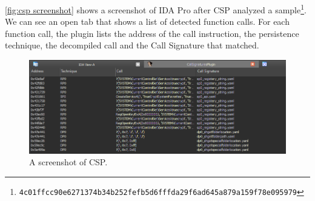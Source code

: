 \medskip

\autoref{fig:csp screenshot} shows a screenshot of IDA Pro after CSP analyzed a sample\footnote{\texttt{4c01ffcc90e6271374b34b252fefb5d6fffda29f6ad645a879a159f78e095979}}.
We can see an open tab that shows a list of detected function calls. For each function call, the plugin lists the address of the call instruction, the persistence technique, the decompiled call and the Call Signature that matched.

\begin{figure}[ht]
    \centering
    \includegraphics[width=\textwidth]{resources/images/csp_screenshot.png}
    \caption{A screenshot of CSP.}
    \label{fig:csp screenshot}
\end{figure}



